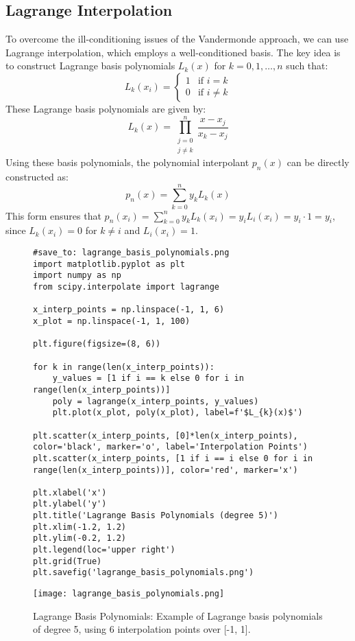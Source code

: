 \documentclass{article}
\begin{document}
\subsection{Lagrange Interpolation}

To overcome the ill-conditioning issues of the Vandermonde approach, we can use Lagrange interpolation, which employs a well-conditioned basis. The key idea is to construct Lagrange basis polynomials $L_k(x)$ for $k = 0, 1, \dots, n$ such that:
\[ L_k(x_i) = \begin{cases} 1 & \text{if } i = k \\ 0 & \text{if } i \neq k \end{cases} \]
These Lagrange basis polynomials are given by:
\[ L_k(x) = \prod_{\substack{j=0 \\ j \neq k}}^n \frac{x - x_j}{x_k - x_j} \]
Using these basis polynomials, the polynomial interpolant $p_n(x)$ can be directly constructed as:
\[ p_n(x) = \sum_{k=0}^n y_k L_k(x) \]
This form ensures that $p_n(x_i) = \sum_{k=0}^n y_k L_k(x_i) = y_i L_i(x_i) = y_i \cdot 1 = y_i$, since $L_k(x_i) = 0$ for $k \neq i$ and $L_i(x_i) = 1$.

\begin{figure}[h]
    \centering
    \begin{verbatim}
#save_to: lagrange_basis_polynomials.png
import matplotlib.pyplot as plt
import numpy as np
from scipy.interpolate import lagrange

x_interp_points = np.linspace(-1, 1, 6)
x_plot = np.linspace(-1, 1, 100)

plt.figure(figsize=(8, 6))

for k in range(len(x_interp_points)):
    y_values = [1 if i == k else 0 for i in range(len(x_interp_points))]
    poly = lagrange(x_interp_points, y_values)
    plt.plot(x_plot, poly(x_plot), label=f'$L_{k}(x)$')

plt.scatter(x_interp_points, [0]*len(x_interp_points), color='black', marker='o', label='Interpolation Points')
plt.scatter(x_interp_points, [1 if i == i else 0 for i in range(len(x_interp_points))], color='red', marker='x')

plt.xlabel('x')
plt.ylabel('y')
plt.title('Lagrange Basis Polynomials (degree 5)')
plt.xlim(-1.2, 1.2)
plt.ylim(-0.2, 1.2)
plt.legend(loc='upper right')
plt.grid(True)
plt.savefig('lagrange_basis_polynomials.png')
    \end{verbatim}
    \texttt{[image: lagrange\_basis\_polynomials.png]}
    \caption{Lagrange Basis Polynomials: Example of Lagrange basis polynomials of degree 5, using 6 interpolation points over [-1, 1].}
    \label{fig:lagrange_basis_polynomials}
\end{figure}
\end{document}
